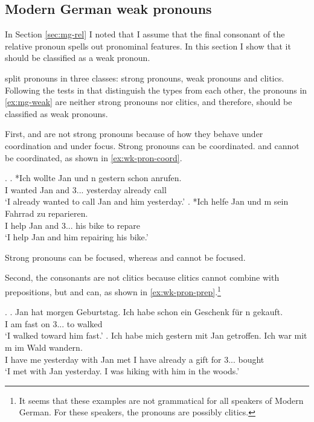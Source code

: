 \subsection{Modern German weak pronouns}\label{sec:mg-weak-pronoun}

In Section \ref{sec:mg-rel} I noted that I assume that the final consonant of the relative pronoun spells out pronominal features. In this section I show that it should be classified as a weak pronoun.

\citet{cardinaletti1994} split pronouns in three classes: strong pronouns, weak pronouns and clitics. Following the tests in \citet{cardinaletti1994} that distinguish the types from each other, the pronouns in \ref{ex:mg-weak} are neither strong pronouns nor clitics, and therefore, should be classified as weak pronouns.

First,  and  are not strong pronouns because of how they behave under coordination and under focus.
Strong pronouns can be coordinated.  and  cannot be coordinated, as shown in \ref{ex:wk-pron-coord}.

\ex.\label{ex:wk-pron-coord}
\ag. *Ich wollte Jan und n gestern schon anrufen.\\
 I wanted Jan and 3... yesterday already call\\
 `I already wanted to call Jan and him yesterday.'
\bg. *Ich helfe Jan und m sein Fahrrad zu reparieren.\\
 I help Jan and 3... his bike to repare\\
 `I help Jan and him repairing his bike.'

Strong pronouns can be focused, whereas  and  cannot be focused.

Second, the consonants are not clitics because clitics cannot combine with prepositions, but  and  can, as shown in \ref{ex:wk-pron-prep}.\footnote{
It seems that these examples are not grammatical for all speakers of Modern German. For these speakers, the pronouns are possibly clitics.
}

\ex.\label{ex:wk-pron-prep}
\ag. Jan hat morgen Geburtstag. Ich habe schon ein Geschenk für n gekauft.\\
 I am fast on 3... to walked\\
 `I walked toward him fast.'
\bg. Ich habe mich gestern mit Jan getroffen. Ich war mit m im Wald wandern.\\
 I have me yesterday with Jan met I have already a gift for 3... bought\\
 `I met with Jan yesterday. I was hiking with him in the woods.'

